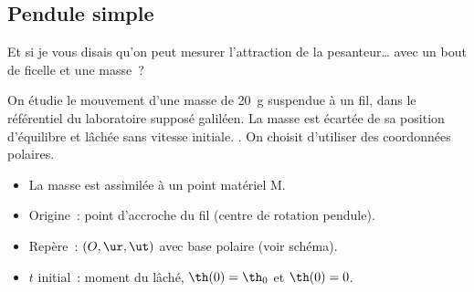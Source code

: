 \documentclass[../../main/main.tex]{subfiles}
\begin{document}
\subsection{Pendule simple}
Et si je vous disais qu'on peut mesurer l'attraction de la pesanteur… avec un
bout de ficelle et une masse~?
\bigbreak

\hspace*{-0.75cm}
\begin{minipage}{0.70\linewidth}
	\begin{enumerate}[label=\sqenumi]
		 On étudie le mouvement d'une masse de
		\SI{20}{g} suspendue à un fil, dans le référentiel du laboratoire
		supposé galiléen. La masse est écartée de sa position d'équilibre et
		lâchée sans vitesse initiale.
		.
		 On choisit d'utiliser des coordonnées polaires.
		\begin{itemize}
			\item La masse est assimilée à un point matériel M.
			\item Origine~: point d'accroche du fil (centre de rotation
			      pendule).
			\item Repère~: $(O,\ur,\ut)$ avec base polaire (voir schéma).
			\item $t$ initial~: moment du lâché, $\th(0) = \th_0$ et
			      $\th(0) = 0$.
		\end{itemize}
	\end{enumerate}
\end{minipage}
\hfill
\end{document}
